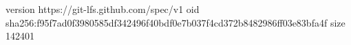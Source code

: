 version https://git-lfs.github.com/spec/v1
oid sha256:f95f7ad0f3980585df342496f40bdf0e7b037f4cd372b8482986ff03e83bfa4f
size 142401
